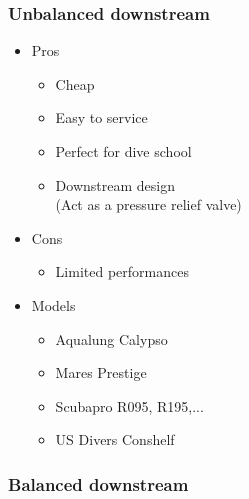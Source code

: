 \documentclass[aspectratio=1610,english,12pt]{beamer}
\begin{document}
\subsubsection{Unbalanced downstream}
\begin{frame}{\insertsubsubsection}
\end{frame}

\begin{frame}{\insertsubsubsection}
	\begin{itemize}
		\item Pros
		\begin{itemize}
			\item Cheap
			\item Easy to service
			\item Perfect for dive school
			\item Downstream design \\ (Act as a pressure relief valve)
		\end{itemize}
		\item Cons
		\begin{itemize}
			\item Limited performances
		\end{itemize}
	\end{itemize}
\end{frame}

\begin{frame}{\insertsubsubsection}
	\begin{itemize}
		\item Models
		\begin{itemize}
			\item Aqualung Calypso
			\item Mares Prestige
			\item Scubapro R095, R195,...
			\item US Divers Conshelf
		\end{itemize}
	\end{itemize}
\end{frame}


\subsubsection{Balanced downstream}
\begin{frame}{\insertsubsubsection}
\end{frame}

\begin{frame}{\insertsubsubsection}
\end{frame}
\end{document}
